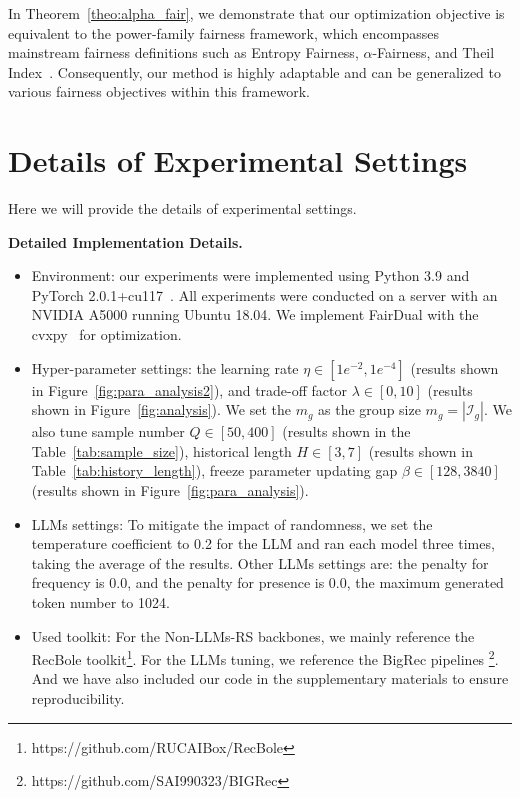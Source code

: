In Theorem~\ref{theo:alpha_fair}, we demonstrate that our optimization objective is equivalent to the power-family fairness framework, which encompasses mainstream fairness definitions such as Entropy Fairness, $\alpha$-Fairness, and Theil Index~\cite{lan2011axiomatic}. Consequently, our method is highly adaptable and can be generalized to various fairness objectives within this framework.

\section{Details of Experimental Settings}\label{app:exp_settings}
Here we will provide the details of experimental settings.

\textbf{Detailed Implementation Details.} 


\begin{itemize}
\item Environment: our experiments were implemented using Python 3.9 and PyTorch 2.0.1+cu117~\citep{pytorch}. All experiments were conducted on a server with an NVIDIA A5000 running Ubuntu 18.04. We implement FairDual with the cvxpy~\citep{cvxpy} for optimization.

\item Hyper-parameter settings: the learning rate $\eta\in [1e^{-2},1e^{-4}]$ (results shown in Figure~\ref{fig:para_analysis2}), and trade-off factor $\lambda\in [0, 10]$ (results shown in Figure~\ref{fig:analysis}). We set the $m_g$ as the group size $m_g=|\mathcal{I}_g|$. We also tune sample number $Q\in [50, 400]$ (results shown in the Table~\ref{tab:sample_size}), historical length $H\in [3,7]$ (results shown in Table~\ref{tab:history_length}), freeze parameter updating gap $\beta\in[128, 3840]$ (results shown in Figure~\ref{fig:para_analysis}). 

\item LLMs settings: To mitigate the impact of randomness, we set the temperature coefficient to 0.2 for the LLM and ran each model three times, taking the average of the results. Other LLMs settings are: the penalty for frequency is 0.0, and the penalty for presence is 0.0, the maximum generated token number to 1024.

\item Used toolkit: For the Non-LLMs-RS backbones, we mainly reference the RecBole toolkit\footnote{https://github.com/RUCAIBox/RecBole}. For the LLMs tuning, we reference the BigRec pipelines \footnote{https://github.com/SAI990323/BIGRec}. And we have also included our code in the supplementary materials to ensure reproducibility.
\end{itemize}



